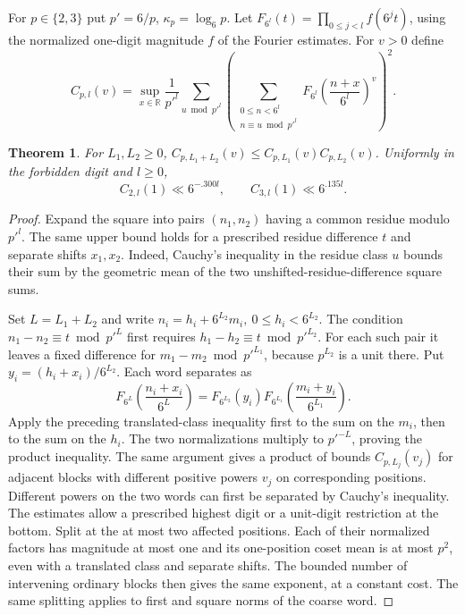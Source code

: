 \documentclass[11pt,a4paper]{article}
\theoremstyle{paperplain}
\newtheorem{theorem}{Theorem}[section]
\numberwithin{equation}{section}
\begin{document}
For \(p\in\{2,3\}\) put \(p'=6/p\), \(\kappa_p=\log_6p\).
Let \(F_{6^l}(t)=\prod_{0\le j<l} f(6^jt)\), using the
normalized one-digit magnitude \(f\) of the Fourier estimates.
For \(v>0\) define
\[
 C_{p,l}(v)=\sup_{x\in\mathbb R}\frac1{p'^l}
 \sum_{u\bmod p'^l}
 \left(\sum_{\substack{0\le n<6^l\\n\equiv u\bmod p'^l}}
 F_{6^l}\left(\frac{n+x}{6^l}\right)^v\right)^2.
\]
\begin{theorem}\label{six:joint-tail-moment}
For \(L_1,L_2\ge0\),
\(C_{p,L_1+L_2}(v)\le C_{p,L_1}(v)C_{p,L_2}(v)\).
Uniformly in the forbidden digit and \(l\ge0\),
\[
 C_{2,l}(1)\ll6^{-.300l},\qquad C_{3,l}(1)\ll6^{.135l}.
\]
\end{theorem}
\begin{proof}
Expand the square into pairs \((n_1,n_2)\) having a common
residue modulo \(p'^l\). The same upper bound holds for a
prescribed residue difference \(t\) and separate shifts
\(x_1,x_2\). Indeed, Cauchy's inequality in the residue class
\(u\) bounds their sum by the geometric mean of the two
unshifted-residue-difference square sums.

Set \(L=L_1+L_2\) and write
\(n_i=h_i+6^{L_2}m_i,\ 0\le h_i<6^{L_2}\).
The condition \(n_1-n_2\equiv t\bmod p'^L\) first requires
\(h_1-h_2\equiv t\bmod p'^{L_2}\).
For each such pair it leaves a fixed difference for
\(m_1-m_2\bmod p'^{L_1}\), because \(p^{L_2}\) is a unit
there. Put \(y_i=(h_i+x_i)/6^{L_2}\). Each word separates as
\[
 F_{6^L}\left(\frac{n_i+x_i}{6^L}\right)
 =F_{6^{L_2}}(y_i)F_{6^{L_1}}\left(\frac{m_i+y_i}{6^{L_1}}\right).
\]
Apply the preceding translated-class inequality first to the
sum on the \(m_i\), then to the sum on the \(h_i\).
The two normalizations multiply to \(p'^{-L}\), proving the
product inequality. The same argument gives a product of
bounds \(C_{p,L_j}(v_j)\) for adjacent blocks with different
positive powers \(v_j\) on corresponding positions.
Different powers on the two words can first be separated by
Cauchy's inequality. The estimates allow a prescribed highest
digit or a unit-digit restriction at the bottom. Split at the
at most two affected positions. Each of their normalized factors
has magnitude at most one and its one-position coset mean is at
most \(p^2\), even with a translated class and separate shifts.
The bounded number of intervening ordinary blocks then gives the
same exponent, at a constant cost. The same splitting applies
to first and square norms of the coarse word.


\end{proof}
\end{document}
